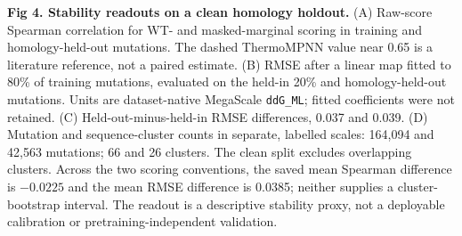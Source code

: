 \caption{{\bf Fig 4. Stability readouts on a clean homology holdout.} (A) Raw-score Spearman correlation for WT- and masked-marginal scoring in training and homology-held-out mutations. The dashed ThermoMPNN value near 0.65 is a literature reference, not a paired estimate. (B) RMSE after a linear map fitted to 80\% of training mutations, evaluated on the held-in 20\% and homology-held-out mutations. Units are dataset-native MegaScale \texttt{ddG\_ML}; fitted coefficients were not retained. (C) Held-out-minus-held-in RMSE differences, 0.037 and 0.039. (D) Mutation and sequence-cluster counts in separate, labelled scales: 164,094 and 42,563 mutations; 66 and 26 clusters. The clean split excludes overlapping clusters. Across the two scoring conventions, the saved mean Spearman difference is $-0.0225$ and the mean RMSE difference is 0.0385; neither supplies a cluster-bootstrap interval. The readout is a descriptive stability proxy, not a deployable calibration or pretraining-independent validation.}
